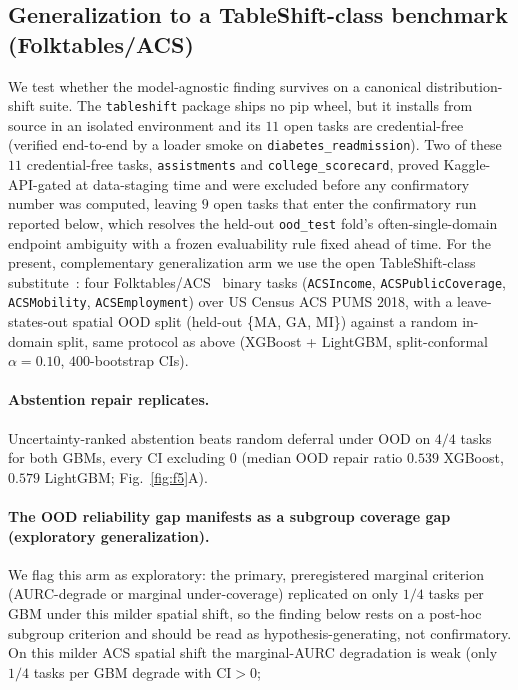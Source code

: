 \documentclass[11pt]{article}
\begin{document}
\subsection*{Generalization to a TableShift-class benchmark (Folktables/ACS)}
We test whether the model-agnostic finding survives on a canonical distribution-shift suite. The
\texttt{tableshift} package ships no pip wheel, but it installs from source in an isolated environment and its
$11$ open tasks are credential-free (verified end-to-end by a loader smoke on
\texttt{diabetes\_readmission}). Two of these $11$ credential-free tasks, \texttt{assistments} and
\texttt{college\_scorecard}, proved Kaggle-API-gated at data-staging time and were excluded before any
confirmatory number was computed, leaving $9$ open tasks that enter the confirmatory run reported below, which
resolves the held-out \texttt{ood\_test} fold's often-single-domain endpoint ambiguity with a frozen
evaluability rule fixed ahead of time. For the present, complementary generalization arm we use the open
TableShift-class substitute~\citep{gardner2023tableshift}: four
Folktables/ACS~\citep{ding2021retiring} binary tasks (\texttt{ACSIncome}, \texttt{ACSPublicCoverage},
\texttt{ACSMobility}, \texttt{ACSEmployment}) over US Census ACS PUMS 2018, with a leave-states-out
spatial OOD split (held-out \{MA, GA, MI\}) against a random in-domain split, same protocol as above
(XGBoost + LightGBM, split-conformal $\alpha=0.10$, $400$-bootstrap CIs). \paragraph{Abstention repair
replicates.} Uncertainty-ranked abstention beats random deferral under OOD on $4/4$ tasks for both
GBMs, every CI excluding $0$ (median OOD repair ratio $0.539$ XGBoost, $0.579$ LightGBM;
Fig.~\ref{fig:f5}A). \paragraph{The OOD reliability gap manifests as a subgroup coverage gap (exploratory
generalization).} We flag this arm as exploratory: the primary, preregistered marginal criterion
(AURC-degrade or marginal under-coverage) replicated on only $1/4$ tasks per GBM under this milder spatial
shift, so the finding below rests on a post-hoc subgroup criterion and should be read as hypothesis-generating,
not confirmatory. On this milder
ACS spatial shift the marginal-AURC degradation is weak (only $1/4$ tasks per GBM degrade with CI$>0$;
\end{document}
